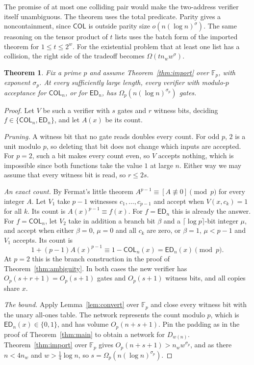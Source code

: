 \documentclass[11pt]{article}
\newtheorem{theorem}{Theorem}[section]
\theoremstyle{definition}
\theoremstyle{remark}
\newcommand{\ED}{\mathsf{ED}}
\newcommand{\F}{\mathbb{F}}
\begin{document}
The promise of at most one colliding pair would make the two-address
verifier itself unambiguous. The theorem uses the total predicate.
Parity gives a noncontainment, since $\mathsf{COL}$ is outside parity
size $o(n(\log n)^\sigma)$.
The same reasoning on the tensor product of $t$ lists uses the batch
form of the imported theorem for $1\le t\le2^w$. For the existential
problem that at least one list has a collision, the right side of
the tradeoff becomes $\Omega(t n_w w^\sigma)$.

\begin{theorem}\label{thm:modular-verifier}
Fix a prime $p$ and assume Theorem~\ref{thm:import} over $\F_p$, with
exponent $\sigma_p$. At every sufficiently large length, every verifier
with modulo-$p$ acceptance for $\mathsf{COL}_n$, or for $\ED_n$, has
$\Omega_p(n(\log n)^{\sigma_p})$ gates.
\end{theorem}
\begin{proof}
Let $V$ be such a verifier with $s$ gates and $r$ witness bits, deciding
$f\in\{\mathsf{COL}_n,\ED_n\}$, and let $A(x)$ be its count.

\emph{Pruning.} A witness bit that no gate reads doubles every count. For
odd $p$, $2$ is a unit modulo $p$, so deleting that bit does not change
which inputs are accepted. For $p=2$, such a bit makes every count even,
so $V$ accepts nothing, which is impossible since both functions take the
value $1$ at large $n$. Either way we may assume that every witness bit is
read, so $r\le2s$.

\emph{An exact count.} By Fermat's little theorem
$A^{p-1}\equiv[A\not\equiv0]\pmod p$ for every integer $A$. Let $V_1$
take $p-1$ witnesses $c_1,\dots,c_{p-1}$ and accept when $V(x,c_k)=1$ for
all $k$. Its count is $A(x)^{p-1}\equiv f(x)$. For $f=\ED_n$ this is
already the answer. For $f=\mathsf{COL}_n$, let $V_2$ take in addition a
branch bit $\beta$ and a $\lceil\log p\rceil$-bit integer $\mu$, and
accept when either $\beta=0$, $\mu=0$ and all $c_k$ are zero, or
$\beta=1$, $\mu<p-1$ and $V_1$ accepts. Its count is
\[
1+(p-1)A(x)^{p-1}\equiv1-\mathsf{COL}_n(x)=\ED_n(x)\pmod p.
\]
At $p=2$ this is the branch construction in the proof of
Theorem~\ref{thm:ambiguity}. In both cases the new verifier has
$O_p(s+r+1)=O_p(s+1)$ gates and $O_p(s+1)$ witness bits, and all copies
share $x$.

\emph{The bound.} Apply Lemma~\ref{lem:convert} over $\F_p$ and close
every witness bit with the unary all-ones table. The network represents
the count modulo $p$, which is $\ED_n(x)\in\{0,1\}$, and has volume
$O_p(n+s+1)$. Pin the padding as in the proof of Theorem~\ref{thm:main}
to obtain a network for $D_{w(n)}$. Theorem~\ref{thm:import} over $\F_p$
gives $O_p(n+s+1)>n_ww^{\sigma_p}$, and as there $n<4n_w$ and
$w>\tfrac14\log n$, so $s=\Omega_p(n(\log n)^{\sigma_p})$.
\end{proof}
\end{document}

